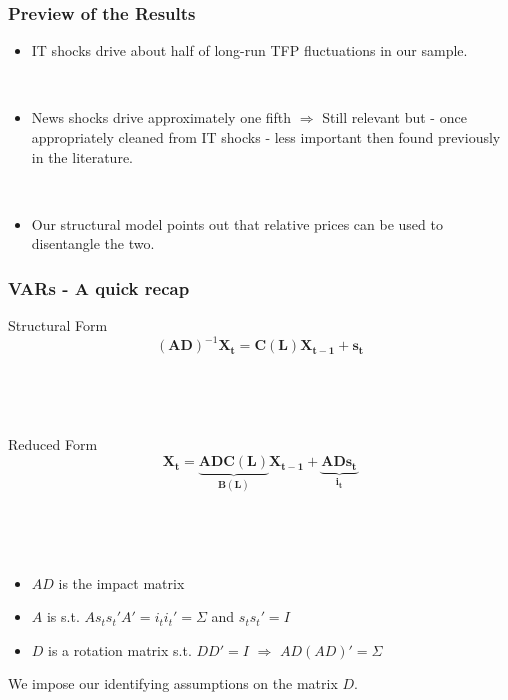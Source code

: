 \documentclass{beamer}
\begin{document}
\begin{frame}
\frametitle{Preview of the Results}

\begin{itemize}
	\item IT shocks drive about half of long-run TFP fluctuations in our sample. 
	
	\
	
	\item News shocks drive approximately one fifth $\Rightarrow$ Still relevant but - once appropriately cleaned from IT shocks - less important then found previously in the literature.
	 
	\
	
	
	\item Our structural model points out that relative prices can be used to disentangle the two. 
	
\end{itemize} 

\end{frame}

\begin{frame}
	\frametitle{VARs - A quick recap}
	\label{identification}
	
Structural Form	
\begin{equation}
(\mathbf{AD})^{-1}
    \mathbf{X_{t}}
= \mathbf{C(L)} 
\mathbf{X_{t-1}}
+ \mathbf{s_t}
\end{equation}

\

\

Reduced Form
\begin{equation}
\mathbf{X_{t}}
= \underbrace{\mathbf{AD} \mathbf{C(L)}}_\text{$\mathbf{B(L)}$} 
\mathbf{X_{t-1}}
+ \underbrace{\mathbf{AD} \mathbf{s_t}}_\text{$\mathbf{i_t}$}
\end{equation}

\

\

\begin{itemize}
	\item $AD$ is the impact matrix
	\item $A$ is s.t. $As_t s_t' A' = i_t i_t' = \Sigma$ and $s_t s_t' = I$
	\item $D$ is a rotation matrix s.t. $DD' = I$ $\Rightarrow$ $AD(AD)' = \Sigma$
\end{itemize}

We impose our identifying assumptions on the matrix $D$. \hyperlink{Technicalities}{}

\end{frame}
\end{document}
